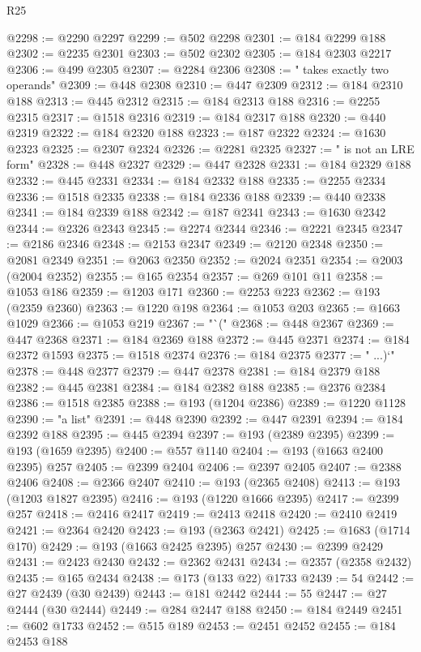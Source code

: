 \begin{lexlean}{R25}
\begin{coremodule}
@2298 := @2290 @2297
@2299 := @502 @2298
@2301 := @184 @2299 @188
@2302 := @2235 @2301
@2303 := @502 @2302
@2305 := @184 @2303 @2217
@2306 := @499 @2305
@2307 := @2284 @2306
@2308 := " takes exactly two operands"
@2309 := @448 @2308
@2310 := @447 @2309
@2312 := @184 @2310 @188
@2313 := @445 @2312
@2315 := @184 @2313 @188
@2316 := @2255 @2315
@2317 := @1518 @2316
@2319 := @184 @2317 @188
@2320 := @440 @2319
@2322 := @184 @2320 @188
@2323 := @187 @2322
@2324 := @1630 @2323
@2325 := @2307 @2324
@2326 := @2281 @2325
@2327 := " is not an LRE form"
@2328 := @448 @2327
@2329 := @447 @2328
@2331 := @184 @2329 @188
@2332 := @445 @2331
@2334 := @184 @2332 @188
@2335 := @2255 @2334
@2336 := @1518 @2335
@2338 := @184 @2336 @188
@2339 := @440 @2338
@2341 := @184 @2339 @188
@2342 := @187 @2341
@2343 := @1630 @2342
@2344 := @2326 @2343
@2345 := @2274 @2344
@2346 := @2221 @2345
@2347 := @2186 @2346
@2348 := @2153 @2347
@2349 := @2120 @2348
@2350 := @2081 @2349
@2351 := @2063 @2350
@2352 := @2024 @2351
@2354 := @2003 (@2004 @2352)
@2355 := @165 @2354
@2357 := @269 @101 @11
@2358 := @1053 @186
@2359 := @1203 @171
@2360 := @2253 @223
@2362 := @193 (@2359 @2360)
@2363 := @1220 @198
@2364 := @1053 @203
@2365 := @1663 @1029
@2366 := @1053 @219
@2367 := "`("
@2368 := @448 @2367
@2369 := @447 @2368
@2371 := @184 @2369 @188
@2372 := @445 @2371
@2374 := @184 @2372 @1593
@2375 := @1518 @2374
@2376 := @184 @2375
@2377 := " ...)`"
@2378 := @448 @2377
@2379 := @447 @2378
@2381 := @184 @2379 @188
@2382 := @445 @2381
@2384 := @184 @2382 @188
@2385 := @2376 @2384
@2386 := @1518 @2385
@2388 := @193 (@1204 @2386)
@2389 := @1220 @1128
@2390 := "a list"
@2391 := @448 @2390
@2392 := @447 @2391
@2394 := @184 @2392 @188
@2395 := @445 @2394
@2397 := @193 (@2389 @2395)
@2399 := @193 (@1659 @2395)
@2400 := @557 @1140
@2404 := @193 (@1663 @2400 @2395) @257
@2405 := @2399 @2404
@2406 := @2397 @2405
@2407 := @2388 @2406
@2408 := @2366 @2407
@2410 := @193 (@2365 @2408)
@2413 := @193 (@1203 @1827 @2395)
@2416 := @193 (@1220 @1666 @2395)
@2417 := @2399 @257
@2418 := @2416 @2417
@2419 := @2413 @2418
@2420 := @2410 @2419
@2421 := @2364 @2420
@2423 := @193 (@2363 @2421)
@2425 := @1683 (@1714 @170)
@2429 := @193 (@1663 @2425 @2395) @257
@2430 := @2399 @2429
@2431 := @2423 @2430
@2432 := @2362 @2431
@2434 := @2357 (@2358 @2432)
@2435 := @165 @2434
@2438 := @173 (@133 @22) @1733
@2439 := 54
@2442 := @27 @2439 (@30 @2439)
@2443 := @181 @2442
@2444 := 55
@2447 := @27 @2444 (@30 @2444)
@2449 := @284 @2447 @188
@2450 := @184 @2449
@2451 := @602 @1733
@2452 := @515 @189
@2453 := @2451 @2452
@2455 := @184 @2453 @188

\end{coremodule}
\end{lexlean}
